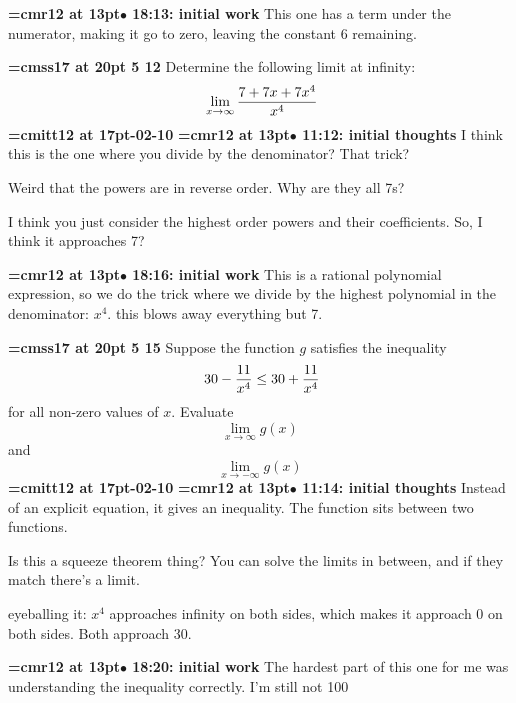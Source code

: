 {\smallskip\noindent\bf\font\titlefont=cmr12 at 13pt\titlefont $\bullet$ 18:13: initial work}\smallskip
This one has a term under the numerator, making it go to zero, leaving the constant 6 remaining.
\par

{\medskip\noindent\bf\font\titlefont=cmss17 at 20pt 5 12}\medskip
Determine the following limit at infinity:
$$\
\lim_{x \to \infty}{
7 + 7x + 7x^4
\over
x^4
}
$$
{\medskip\noindent\bf\font\titlefont=cmitt12 at 17pt-02-10}\medskip
{\smallskip\noindent\bf\font\titlefont=cmr12 at 13pt\titlefont $\bullet$ 11:12: initial thoughts}\smallskip
I think this is the one where you divide by the denominator? That trick?
\par

Weird that the powers are in reverse order. Why are they all 7s?
\par

I think you just consider the highest order powers and their coefficients. So, I think it approaches 7?
\par

{\smallskip\noindent\bf\font\titlefont=cmr12 at 13pt\titlefont $\bullet$ 18:16: initial work}\smallskip
This is a rational polynomial expression, so we do the trick where we divide by the highest polynomial in the denominator: $x^4$. this blows away everything but 7.
\par

{\medskip\noindent\bf\font\titlefont=cmss17 at 20pt 5 15}\medskip
Suppose the function $g$ satisfies the inequality
$$\
30 - {11 \over x^4} \le 30 + {11 \over x^4}
$$
for all non-zero values of $x$. Evaluate
$$\lim_{x \to \infty}{g(x)}$$
and
$$\lim_{x \to -\infty}{g(x)}$$
{\medskip\noindent\bf\font\titlefont=cmitt12 at 17pt-02-10}\medskip
{\smallskip\noindent\bf\font\titlefont=cmr12 at 13pt\titlefont $\bullet$ 11:14: initial thoughts}\smallskip
Instead of an explicit equation, it gives an inequality. The function sits between two functions.
\par

Is this a squeeze theorem thing? You can solve the limits in between, and if they match there's a limit.
\par

eyeballing it: $x^4$ approaches infinity on both sides, which makes it approach 0 on both sides. Both approach 30.
\par

{\smallskip\noindent\bf\font\titlefont=cmr12 at 13pt\titlefont $\bullet$ 18:20: initial work}\smallskip
The hardest part of this one for me was understanding the inequality correctly. I'm still not 100%
\par

